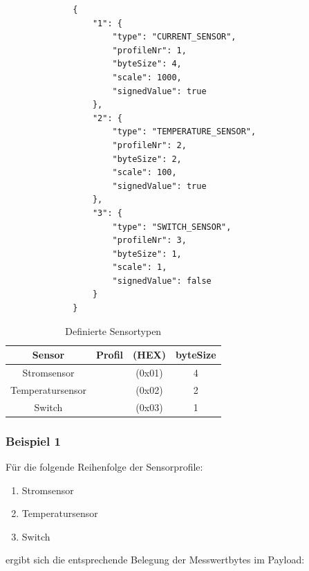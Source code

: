 \begin{figure}[H]
	\begin{verbatim}
		{
			"1": {
				"type": "CURRENT_SENSOR",
				"profileNr": 1,
				"byteSize": 4,
				"scale": 1000,
				"signedValue": true
			},
			"2": {
				"type": "TEMPERATURE_SENSOR",
				"profileNr": 2,
				"byteSize": 2,
				"scale": 100,
				"signedValue": true
			},
			"3": {
				"type": "SWITCH_SENSOR",
				"profileNr": 3,
				"byteSize": 1,
				"scale": 1,
				"signedValue": false
			}
		}
	\end{verbatim}
\end{figure}

	
	
	\begin{table}[H]
		\centering
		\caption{Definierte Sensortypen}
		\begin{tabular}{c|c|c|c}
			\hline
			Sensor & Profil & \PYTHON{ProfileNr} (HEX) & byteSize\\
			\hline
			Stromsensor & \PYTHON{CURRENT\_SENSOR} & \PYTHON{1} (0x01) & 4  \\
			\hline
			Temperatursensor & \PYTHON{TEMPERATURE\_SENSOR} & \PYTHON{2} (0x02) & 2 \\
			\hline
			Switch & \PYTHON{SWITCH\_SENSOR} & \PYTHON{3} (0x03) & 1 \\
			\hline
		\end{tabular}
	\end{table}
	
\subsubsection{Beispiel 1}

	Für die folgende Reihenfolge der Sensorprofile:
	\begin{enumerate}
		\item Stromsensor
		\item Temperatursensor
		\item Switch
	\end{enumerate}
	
	ergibt sich die entsprechende Belegung der Messwertbytes im Payload:
	
